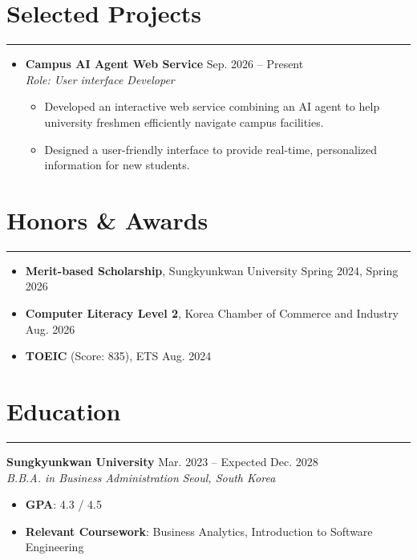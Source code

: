 \documentclass[letterpaper, 10pt]{article}
\begin{document}
\section*{Selected Projects} 
\hrule 
\vspace{4pt}
\begin{itemize}
    \item[] 
    \textbf{Campus AI Agent Web Service} \hfill Sep. 2026 -- Present \\
    \textit{Role: User interface Developer}
    \begin{itemize}
        \item Developed an interactive web service combining an AI agent to help university freshmen efficiently navigate campus facilities.
        \item Designed a user-friendly interface to provide real-time, personalized information for new students.
    \end{itemize}
\end{itemize}
\section*{Honors \& Awards} 
\hrule 
\vspace{4pt}
\begin{itemize}
    \item \textbf{Merit-based Scholarship}, Sungkyunkwan University \hfill Spring 2024, Spring 2026
    \item \textbf{Computer Literacy Level 2}, Korea Chamber of Commerce and Industry \hfill Aug. 2026
    \item \textbf{TOEIC} (Score: 835), ETS \hfill Aug. 2024
\end{itemize}
\section*{Education} 
\hrule 
\vspace{4pt} 
\noindent
\textbf{Sungkyunkwan University} \hfill Mar. 2023 -- Expected Dec. 2028 \\ 
\textit{B.B.A. in Business Administration} \hfill \textit{Seoul, South Korea} 
\begin{itemize}
    \item \textbf{GPA}: 4.3 / 4.5
    \item \textbf{Relevant Coursework}: Business Analytics, Introduction to Software Engineering
\end{itemize}
\end{document}
